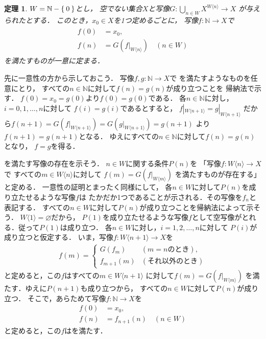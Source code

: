 \documentclass[11pt,a4paper]{ltjsarticle} %
\makeatletter
\theoremstyle{mystyle} %
\newtheorem{thm}{定理} %
\renewenvironment{proof}[1][\proofname]{\par
  \pushQED{\qed}%
  \normalfont \topsep6\p@\@plus6\p@\relax
  \trivlist
\item[\hskip\labelsep
  \itshape
  #1]\ignorespaces%
  }{%
  \popQED\endtrivlist\@endpefalse
}
\renewcommand{\proofname}{\textbf{［証明］}}
\makeatother
\begin{document}
\begin{thm} \label{thm:inddef}
  $W= \mathbb{N} - \Set{0}$とし，
  空でない集合$X$と写像$G \colon \bigcup_{n \in W } 
  X^{W \langle n \rangle} \longrightarrow X$
  が与えられたとする．
  このとき，$x_0 \in X$を1つ定めるごとに，
  写像$f \colon \mathbb{N} \longrightarrow X$で
  \begin{align}
    \begin{aligned}
      f(0) & = x_0 , \\
      f(n) & = G \left( f|_{W \langle n \rangle} \right)
      \quad ( n \in W )
    \end{aligned}
    \label{eq:inddef}
  \end{align}
  を満たすものが一意に定まる．
\end{thm}

\begin{proof}
  先に一意性の方から示しておこう．
  写像$f,g \colon \mathbb{N} \longrightarrow X$で
  を満たすようなものを任意にとり，
  すべての$n \in \mathbb{N}$に対して$f(n) = g(n)$が成り立つことを
  帰納法で示す．
  $f(0) = x_0 = g(0)$より$f(0)=g(0)$である．
  各$n \in \mathbb{N}$に対し，$i= 0,1, \ldots, n$に対して
  $f(i)=g(i)$であるとすると，
  $f|_{W \langle n+1 \rangle} = g|_{W \langle n+1 \rangle} $
  だから$f(n+1) = G \left( f|_{W \langle n+1 \rangle} \right) =
  G \left ( g |_{W \langle n+1 \rangle} \right) = g(n+1)$
  より$f(n+1) =g(n+1)$となる．
  ゆえにすべての$n \in \mathbb{N}$に対して$f(n) = g(n)$となり，
  $f=g$を得る．

  を満たす写像の存在を示そう．
  $n \in W$に関する条件$P(n)$を
  「写像$f \colon W \langle n \rangle \longrightarrow X$で
  すべての$m \in W \langle n \rangle$に対して
  $f(m) = G \left( f|_{W \langle m \rangle } \right)$
  を満たすものが存在する」と定める．
  一意性の証明とまったく同様にして，
  各$n \in W$に対して$P(n)$を成り立たせるような写像$f$は
  たかだか1つであることが示される．その写像を$f_n$と表記する．
  すべての$n \in W$に対して$P(n)$が成り立つことを帰納法によって示そう．
  $W \langle 1 \rangle = \varnothing$だから，
  $P(1)$を成り立たせるような写像$f$として空写像がとれる．従って$P(1)$は成り立つ．
  各$n \in W$に対し，$i=1,2,\ldots,n$に対して
  $P(i)$が成り立つと仮定する．
  いま，写像$f \colon W \langle n+1 \rangle \longrightarrow X$を
  \begin{align*}
    f (m) = 
    \begin{cases}
      G \left( f_{m} \right) & ( \text{$m=n$のとき} ) , \\
      f_{m+1} (m) & (\text{それ以外のとき})
    \end{cases}
  \end{align*}
  と定めると，この$f$はすべての$m \in W \langle n+1 \rangle$
  に対して$f(m) = G \left( f|_{W \langle m \rangle} \right)$
  を満たす．ゆえに$P(n+1)$も成り立つから，
  すべての$n \in W$に対して$P(n)$が成り立つ．
  そこで，あらためて写像$f \colon \mathbb{N} \longrightarrow X$を
  \begin{align*}
    f(0) & = x_0 , \\ 
    f(n) & = f_{n+1} (n) \quad ( n \in W)
  \end{align*}
  と定めると，この$f$はを満たす．
\end{proof}
\end{document}
